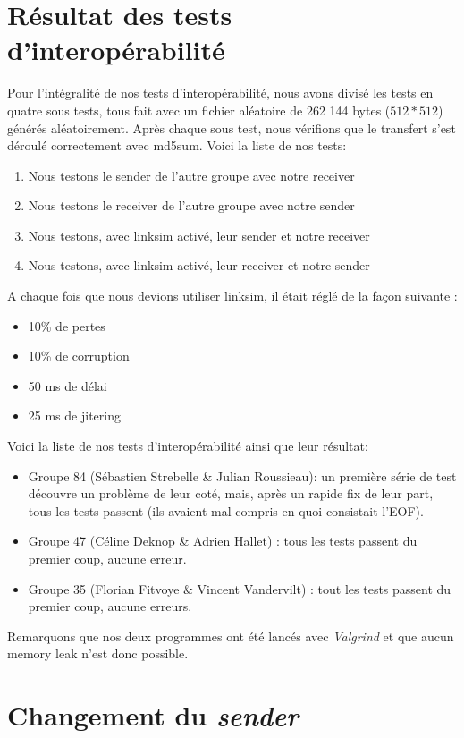\documentclass[12pt,notitlepage]{report}
\begin{document}
\begin{appendices}
\section{Résultat des tests d'interopérabilité}
	Pour l'intégralité de nos tests d'interopérabilité, nous avons divisé les tests en quatre sous tests, tous fait avec un fichier aléatoire de 262 144 bytes ($512*512$) générés aléatoirement. Après chaque sous test, nous vérifions que le transfert s'est déroulé correctement avec md5sum. Voici la liste de nos tests:
\begin{enumerate}
\item Nous testons le sender de l'autre groupe avec notre receiver
\item Nous testons le receiver de l'autre groupe avec notre sender
\item Nous testons, avec linksim activé, leur sender et notre receiver
\item Nous testons, avec linksim activé, leur receiver et notre sender
\end{enumerate}	 
	A chaque fois que nous devions utiliser linksim, il était réglé de la façon suivante : 
	\begin{itemize}
	\item 10\% de pertes
	\item 10\% de corruption
	\item 50 ms de délai
	\item 25 ms de jitering
	\end{itemize}

Voici la liste de nos tests  d'interopérabilité ainsi que leur résultat:
\begin{itemize}
\item Groupe 84 (Sébastien Strebelle \& Julian Roussieau): un première série de test découvre un problème  de leur coté, mais, après un rapide fix de leur part, tous les tests passent (ils avaient mal compris en quoi consistait l'EOF).
\item Groupe 47 (Céline Deknop \& Adrien Hallet) : tous les tests passent du premier coup, aucune erreur.
\item Groupe 35 (Florian Fitvoye \& Vincent Vandervilt) : tout les tests passent du premier coup, aucune erreurs.
\end{itemize}

	Remarquons que nos deux programmes ont été lancés avec \textit{Valgrind} et que aucun memory leak n'est donc possible.

\section{Changement du \textit{sender}}


\end{appendices}
\end{document}
